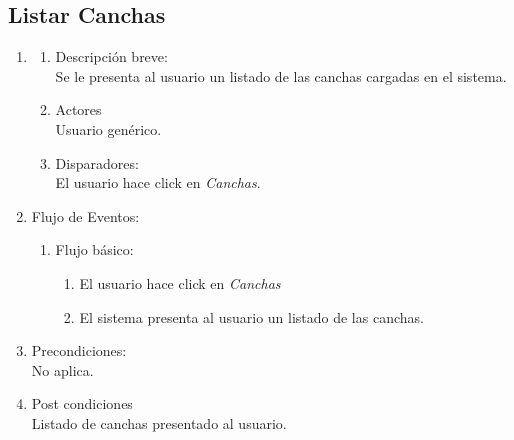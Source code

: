 \documentclass[a4paper,11pt]{article}
\begin{document}
\subsection{Listar Canchas}
\begin{enumerate}

    \item
    \begin{enumerate}
    \item Descripción breve: \\
        Se le presenta al usuario un listado de las canchas cargadas en el sistema.
    \item Actores \\
        Usuario genérico.
    \item Disparadores: \\
        El usuario hace click en \emph{Canchas}.
    \end{enumerate}

    \item Flujo de Eventos:

    \begin{enumerate}

        \item Flujo básico:
        \begin{enumerate}
            \item El usuario hace click en \emph{Canchas}
            \item El sistema presenta al usuario un listado de las canchas.
        \end{enumerate}
    \end{enumerate}

    \item Precondiciones: \\
        No aplica.

    \item Post condiciones \\
        Listado de canchas presentado al usuario.

\end{enumerate}

\end{document}
